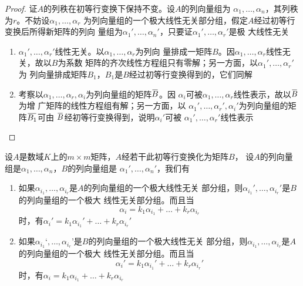 \documentclass[11pt]{article}
\begin{document}
\begin{proof}
证\(A\)的列秩在初等行变换下保持不变。设\(A\)的列向量组为
\(\alpha_1,\dots,\alpha_n\)，其列秩为\(r\)。不妨设\(\alpha_1,\dots,\alpha_r\)
为列向量组的一个极大线性无关部分组，假定\(A\)经过初等行变换后所得新矩阵的列向
量组为\(\alpha_1',\dots,\alpha_n'\)，只要证\(\alpha_1',\dots,\alpha_r'\)是极
大线性无关
\begin{enumerate}
\item \(\alpha_1',\dots,\alpha_r'\)线性无关。以\(\alpha_1,\dots,\alpha_r\)为列向
量排成一矩阵\(B\)。因\(\alpha_1,\dots,\alpha_r\)线性无关，故以\(B\)为系数
矩阵的齐次线性方程组只有零解；另一方面，以\(\alpha_1',\dots,\alpha_r'\)为
列向量排成矩阵\(B_1\)，\(B_1\)是\(B\)经过初等行变换得到的，它们同解
\item 考察以\(\alpha_1,\dots,\alpha_r,\alpha_i\)为列向量组的矩阵\(\bbar{B}\)。因
\(\alpha_i\)可被\(\alpha_1,\dots,\alpha_r\)线性表示，故以\(\bbar{B}\)为增
广矩阵的线性方程组有解；另一方面，以
\(\alpha_1',\dots,\alpha_r',\alpha_i'\)为列向量组的矩阵\(\bbar{B_1}\)可由
\(\bbar{B}\)经初等行变换得到，说明\(\alpha_i'\)可被
\(\alpha_1',\dots,\alpha_r'\)线性表示
\end{enumerate}
\end{proof}

\begin{corollary}[]
设\(A\)是数域\(K\)上的\(m\times m\)矩阵，\(A\)经若干此初等行变换化为矩阵\(B\)，
设\(A\)的列向量组是\(\alpha_1,\dots,\alpha_n\)，\(B\)的列向量组是
\(\alpha_1',\dots,\alpha_n'\)，我们有
\begin{enumerate}
\item 如果\(\alpha_{i_1},\dots,\alpha_{i_r}\)是\(A\)的列向量组的一个极大线性无关
部分组，则\(\alpha_{i_1}',\dots,\alpha_{i_r}'\)是\(B\)的列向量组的一个极大
线性无关部分组。而且当
\begin{equation*}
\alpha_i=k_1\alpha_{i_1}+\dots+k_r\alpha_{i_r}
\end{equation*}
时，有\(\alpha_i'=k_1\alpha_{i_1}'+\dots+k_r\alpha_{i_r}'\)
\item 如果\(\alpha_{i_1}‘,\dots,\alpha_{i_r}’\)是\(B\)的列向量组的一个极大线性无关
部分组，则\(\alpha_{i_1},\dots,\alpha_{i_r}\)是\(A\)的列向量组的一个极大
线性无关部分组。而且当
\begin{equation*}
\alpha_i'=k_1\alpha_{i_1}'+\dots+k_r\alpha_{i_r}'
\end{equation*}
时，有\(\alpha_i=k_1\alpha_{i_1}+\dots+k_r\alpha_{i_r}\)
\end{enumerate}
\end{corollary}
\end{document}
